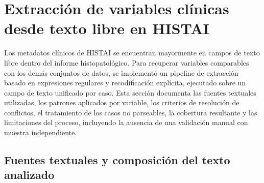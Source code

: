 



\section{Extracción de variables clínicas desde texto libre en HISTAI}
\label{appendix:extraccion_histai}

Los metadatos clínicos de HISTAI se encuentran mayormente en campos de texto libre dentro del informe histopatológico. Para recuperar variables comparables con los demás conjuntos de datos, se implementó un pipeline de extracción basado en expresiones regulares y recodificación explícita, ejecutado sobre un campo de texto unificado por caso. Esta sección documenta las fuentes textuales utilizadas, los patrones aplicados por variable, los criterios de resolución de conflictos, el tratamiento de los casos no parseables, la cobertura resultante y las limitaciones del proceso, incluyendo la ausencia de una validación manual con muestra independiente.

\subsection{Fuentes textuales y composición del texto analizado}


